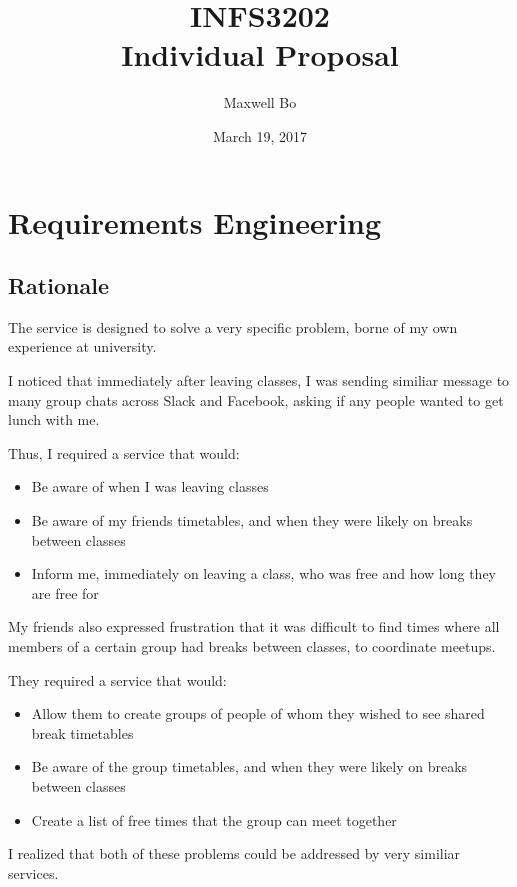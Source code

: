 \documentclass[11pt,a4paper]{report}
\begin{document}
\title{INFS3202 \\ Individual Proposal}
\author{Maxwell Bo}
\date{March 19, 2017}
\maketitle

\chapter{Requirements Engineering}

\section{Rationale}


The service is designed to solve a very specific problem, borne of my own experience at university.

I noticed that immediately after leaving classes, I was sending similiar message to many group chats across Slack and Facebook, asking if any people wanted to get lunch with me.

Thus, I required a service that would:

\begin{itemize}
    \item Be aware of when I was leaving classes
    \item Be aware of my friends timetables, and when they were likely on breaks between classes
    \item Inform me, immediately on leaving a class, who was free and how long they are free for
\end{itemize}

My friends also expressed frustration that it was difficult to find times where all members of a certain group had breaks between classes, to coordinate meetups.

They required a service that would:

\begin{itemize}
    \item Allow them to create groups of people of whom they wished to see shared break timetables
    \item Be aware of the group timetables, and when they were likely on breaks between classes
    \item Create a list of free times that the group can meet together
\end{itemize}

I realized that both of these problems could be addressed by very similiar services. 
\end{document}

